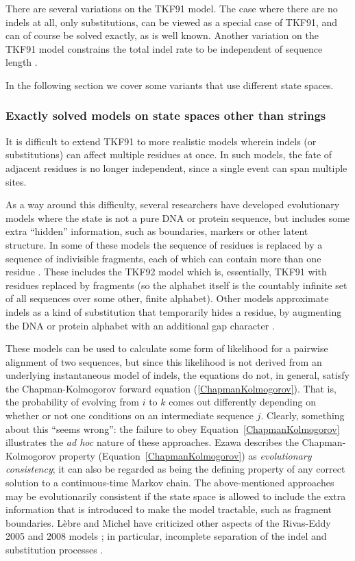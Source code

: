 \documentclass{bmcart}
\newcommand{\eqref}[1]{Equation~\ref{#1}}
\begin{document}
There are several variations on the TKF91 model.
The case where there are no indels at all, only substitutions, can be viewed as a special case of TKF91,
and can of course be solved exactly, as is well known.
Another variation on the TKF91 model constrains the total indel rate to be independent of sequence
length \cite{BouchardCoteJordan2013}.

In the following section we cover some variants that use different state spaces.

\subsubsection*{Exactly solved models on state spaces other than strings}

It is difficult to extend TKF91 to more realistic models wherein indels (or substitutions)
can affect multiple residues at once.
In such models, the fate of adjacent residues is no longer independent, since a single event can span multiple sites.

As a way around this difficulty, several researchers have developed
evolutionary models where the state is not a pure DNA or protein sequence,
but includes some extra ``hidden'' information,
such as boundaries, markers or other latent structure.
In some of these models the sequence of residues is replaced by a sequence of indivisible fragments,
each of which can contain more than one residue \cite{ThorneEtal92,Metzler2003,RivasEddy2015}.
These includes the TKF92 model \cite{ThorneEtal92} which is, essentially, TKF91 with residues replaced by
fragments (so the alphabet itself is the countably infinite set of all sequences over some other, finite alphabet).
Other models approximate indels as a kind of substitution that temporarily hides a residue,
by augmenting the DNA or protein alphabet with an additional gap character \cite{McGuireEtAl2001,Rivas05,RivasEddy2008}.

These models can be used to calculate some form of likelihood for a pairwise alignment of two sequences,
but since this likelihood is not derived from an underlying instantaneous model of indels,
the equations do not, in general, satisfy the Chapman-Kolmogorov forward equation
(\ref{ChapmanKolmogorov}).
That is, the probability of evolving from $i$ to $k$ comes out differently
depending on whether or not one conditions on an intermediate sequence $j$.
Clearly, something about this ``seems wrong'':
the failure to obey \eqref{ChapmanKolmogorov} illustrates the {\em ad hoc}
nature of these approaches.
Ezawa \cite{Ezawa2016b} describes the Chapman-Kolmogorov property
(\eqref{ChapmanKolmogorov}) as {\em evolutionary consistency};
it can also be regarded as being the defining property
of any correct solution to a continuous-time Markov chain.
The above-mentioned approaches may be evolutionarily consistent if the state space
is allowed to include the extra information that is introduced to make the model tractable,
such as fragment boundaries.
\color{red}
L\`{e}bre and Michel have criticized other aspects of the Rivas-Eddy 2005 and 2008 models \cite{Rivas05,RivasEddy2008};
in particular, incomplete separation of the indel and substitution processes \cite{pmid22644340}.
\color{black}
\end{document}

